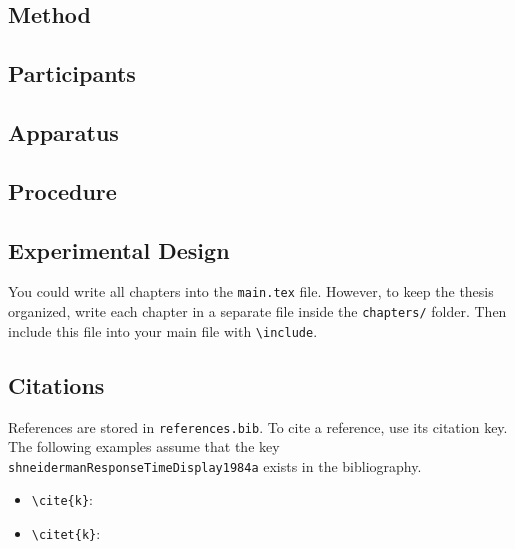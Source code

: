\begin{listing}[H]
\begin{code}
\chapter{Method}
\section{Participants}
\section{Apparatus}
\section{Procedure}
\section{Experimental Design}
\end{code}
\caption{Chapters, sections, and subsections}
\end{listing}

You could write all chapters into the \texttt{main.tex} file. However, to keep the thesis organized, write each chapter in a separate file inside the \texttt{chapters/} folder. Then include this file into your main file with \texttt{\textbackslash include}.

\begin{listing}[H]
\begin{code}






\end{code}
\caption{Including chapter files in main.tex}
\end{listing}


\section{Citations}

References are stored in \texttt{references.bib}. To cite a reference, use its citation key. The following examples assume that the key \texttt{shneidermanResponseTimeDisplay1984a} exists in the bibliography.

\begin{itemize}
    \item \texttt{\textbackslash cite\{k\}}: \cite{shneidermanResponseTimeDisplay1984a}
    \item \texttt{\textbackslash citet\{k\}}: \citet{shneidermanResponseTimeDisplay1984a}
\end{itemize}

